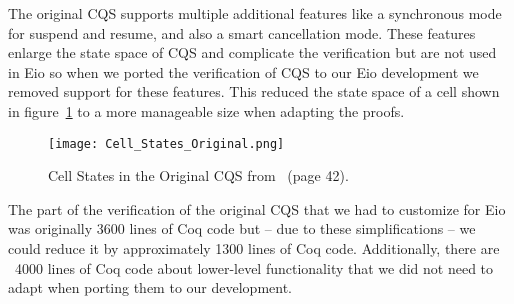 The original CQS supports multiple additional features like a synchronous mode for suspend and resume, and also a smart cancellation mode.
These features enlarge the state space of CQS and complicate the verification but are not used in Eio so when we ported the verification of CQS to our Eio development we removed support for these features.
This reduced the state space of a cell shown in figure~\ref{fig:cqs-cell-states-original} to a more manageable size when adapting the proofs.

\begin{figure}[ht]
  \texttt{[image: Cell\_States\_Original.png]}
  \caption{Cell States in the Original CQS from~\cite{koval2023cqs} (page 42).}
  \label{fig:cqs-cell-states-original}
\end{figure}

The part of the verification of the original CQS that we had to customize for Eio was originally 3600 lines of Coq code but -- due to these simplifications -- we could reduce it by approximately 1300 lines of Coq code.
Additionally, there are ~4000 lines of Coq code about lower-level functionality that we did not need to adapt when porting them to our development.



